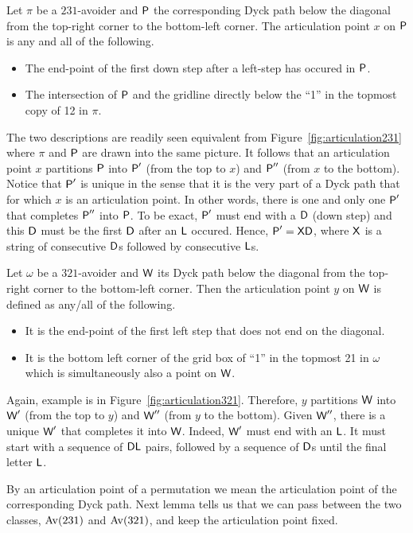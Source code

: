 \documentclass[12pt, a4paper, twoside]{report}
\begin{document}
Let $\pi$ be a $231$-avoider and $\textsf{P}$ the corresponding Dyck path below the diagonal from the top-right corner to the bottom-left corner. The articulation point $x$ on $\textsf{P}$ is any and all of the following.
\begin{itemize}
\item The end-point of the first down step after a left-step has occured in $\textsf{P}$.
\item The intersection of $\textsf{P}$ and the gridline directly below the ``1'' in the topmost copy of 12 in $\pi$.
\end{itemize}
The two descriptions are readily seen equivalent from Figure~\ref{fig:articulation231} where $\pi$ and $\textsf{P}$ are drawn into the same picture. It follows that an articulation point $x$ partitions $\textsf{P}$ into $\textsf{P}'$ (from the top to $x$) and $\textsf{P}''$ (from $x$ to the bottom). Notice that $\textsf{P}'$ is unique in the sense that it is the very part of a Dyck path that for which $x$ is an articulation point. In other words, there is one and only one $\textsf{P}'$ that completes $\textsf{P}''$ into $\textsf{P}$. To be exact, $\textsf{P}'$ must end with a $\mathsf{D}$ (down step) and this $\mathsf{D}$ must be the first $\mathsf{D}$ after an $\mathsf{L}$ occured. Hence, $\textsf{P}' = \mathsf{X}\mathsf{D}$, where $\mathsf{X}$ is a string of consecutive $\mathsf{D}$s followed by consecutive $\mathsf{L}$s.

Let $\omega$ be a $321$-avoider and $\textsf{W}$ its Dyck path below the diagonal from the top-right corner to the bottom-left corner. Then the articulation point $y$ on $\textsf{W}$ is defined as any/all of the following.
\begin{itemize}
\item It is the end-point of the first left step that does not end on the diagonal.
\item It is the bottom left corner of the grid box of ``1'' in the topmost 21 in $\omega$ which is simultaneously also a point on $\textsf{W}$.
\end{itemize}
Again, example is in Figure~\ref{fig:articulation321}. Therefore, $y$ partitions $\textsf{W}$ into $\textsf{W}'$ (from the top to $y$) and $\textsf{W}''$ (from $y$ to the bottom). Given $\textsf{W}''$, there is a unique $\textsf{W}'$ that completes it into $\textsf{W}$. Indeed, $\textsf{W}'$ must end with an $\mathsf{L}$. It must start with a sequence of $\mathsf{D}\mathsf{L}$ pairs, followed by a sequence of $\mathsf{D}$s until the final letter $\mathsf{L}$.

By an articulation point of a permutation we mean the articulation point of the corresponding Dyck path. Next lemma tells us that we can pass between the two classes, $\mathrm{Av}(231)$ and $\mathrm{Av}(321)$, and keep the articulation point fixed.
\end{document}
